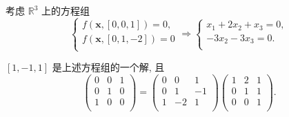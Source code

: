 \documentclass[color=black,device=normal,lang=cn,mode=geye]{elegantnote}
\begin{document}
\begin{solution}
    考虑 $\mathbb{R}^3$ 上的方程组
    \[\begin{cases}
        f(\boldsymbol{x},[0,0,1])=0, \\
        f(\boldsymbol{x},[0,1,-2])=0 \\
    \end{cases}\Rightarrow\begin{cases}
        x_1+2x_2+x_3=0, \\
        -3x_2-3x_3=0. \\
    \end{cases}\]

    $[1,-1,1]$ 是上述方程组的一个解, 且
    \[\begin{pmatrix}
        0 & 0 & 1 \\
        0 & 1 & 0 \\
        1 & 0 & 0 \\
    \end{pmatrix}=\begin{pmatrix}
        0 & 0  & 1 \\
        0 & 1  & -1 \\
        1 & -2 & 1 \\
    \end{pmatrix}\begin{pmatrix}
        1 & 2 & 1 \\
        0 & 1 & 1 \\
        0 & 0 & 1 \\
    \end{pmatrix}.\]


\end{solution}
\end{document}

